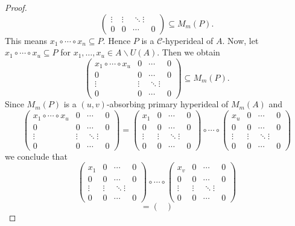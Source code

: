 \documentclass[10pt,a4paper]{amsart}
\begin{document}
\begin{proof}
\[\begin{pmatrix}
\vdots & \vdots & \ddots \vdots \\
0 & 0 & \cdots & 0 
\end{pmatrix}
\subseteq  M_m(P).\]
This means $x_1 \circ \cdots \circ x_n \subseteq P$. Hence $P$ is a $\mathcal{C}$-hyperideal of $A$.
Now, let $x_1 \circ \cdots \circ x_u \subseteq P$ for $x_1, \ldots , x_u \in A \backslash U(A)$. Then we obtain
\[\begin{pmatrix}
x_1 \circ \cdots \circ x_u & 0 & \cdots & 0 \\
0 & 0 & \cdots & 0 \\
\vdots & \vdots & \ddots \vdots \\
0 & 0 & \cdots & 0 
\end{pmatrix}
\subseteq M_m(P).\]
Since $M_m(P)$ is a $(u,v)$-absorbing primary hyperideal of $M_m(A)$ and 
\[ \begin{pmatrix}
x_1 \circ \cdots \circ x_u & 0 & \cdots & 0\\
0 & 0 & \cdots & 0\\
\vdots & \vdots & \ddots \vdots\\
0 & 0 & \cdots & 0
\end{pmatrix}
=
\begin{pmatrix}
x_1 & 0 & \cdots & 0\\
0 & 0 & \cdots & 0\\
\vdots & \vdots & \ddots \vdots\\
0 & 0 & \cdots & 0
\end{pmatrix}
\circ \cdots \circ
\begin{pmatrix}
x_u & 0 & \cdots & 0\\
0 & 0 & \cdots & 0\\
\vdots & \vdots & \ddots \vdots\\
0 & 0 & \cdots & 0
\end{pmatrix}
\]
we conclude that 
\[ \begin{pmatrix}
x_1 & 0 & \cdots & 0\\
0 & 0 & \cdots & 0\\
\vdots& \vdots & \ddots \vdots\\
0 & 0 & \cdots & 0
\end{pmatrix} 
\circ \cdots \circ
\begin{pmatrix}
x_v & 0 & \cdots & 0\\
0 & 0 & \cdots & 0\\
\vdots& \vdots & \ddots \vdots\\
0 & 0 & \cdots & 0
\end{pmatrix}\]
\[=
\begin{pmatrix}

\end{pmatrix}\]
\end{proof}
\end{document}

